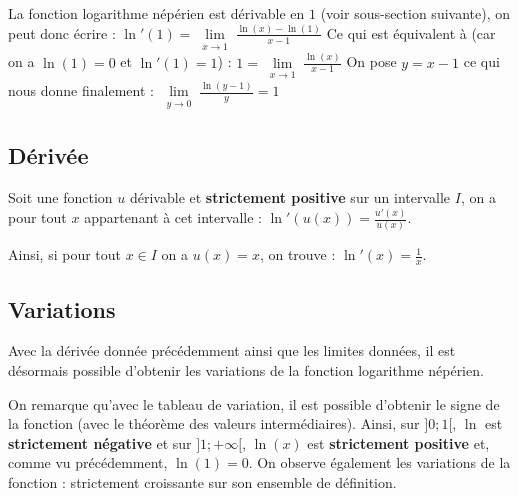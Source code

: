 	\begin{demonstration}
		La fonction logarithme népérien est dérivable en $1$ (voir sous-section suivante), on peut donc écrire :
		\newpar
		$\displaystyle{\ln'(1) = \lim\limits_{\substack{x \rightarrow 1}} \frac{\ln(x) - \ln(1)}{x - 1}}$
		\newpar
		Ce qui est équivalent à (car on a $\ln(1) = 0$ et $\ln'(1) = 1$) :
		\newpar
		$\displaystyle{1 = \lim\limits_{\substack{x \rightarrow 1}} \frac{\ln(x)}{x - 1}}$
		\newpar
		On pose $y = x-1$ ce qui nous donne finalement :
		\newpar
		$\displaystyle{\lim\limits_{\substack{y \rightarrow 0}} \frac{\ln(y - 1)}{y} = 1}$
	\end{demonstration}
	
	\subsection{Dérivée}
	
	\begin{formula}
		Soit une fonction $u$ dérivable et \textbf{strictement positive} sur un intervalle $I$, on a pour tout $x$ appartenant à cet intervalle :
		\newpar
		$\displaystyle{\ln'(u(x)) = \frac{u'(x)}{u(x)}}$.
	\end{formula}
	
	\begin{formula}[Dérivée]
		Ainsi, si pour tout $x \in I$ on a $u(x) = x$, on trouve :
		\newpar
		$\displaystyle{\ln'(x) = \frac{1}{x}}$.
	\end{formula}
	
	\subsection{Variations}
	
	Avec la dérivée donnée précédemment ainsi que les limites données, il est désormais possible d'obtenir les variations de la fonction logarithme népérien.
	
	\begin{formula}
		\contentwidth[big]
		
		On remarque qu'avec le tableau de variation, il est possible d'obtenir le signe de la fonction (avec le théorème des valeurs
		intermédiaires).
		\newpar
		Ainsi, sur $]0;1[$, $\ln$ est \textbf{strictement négative} et sur $]1;+\infty[$,
		$\ln(x)$ est \textbf{strictement positive} et, comme vu précédemment, $\ln(1) = 0$.
		\newpar
		On observe également les variations de la fonction : strictement croissante sur son ensemble de définition.
	\end{formula}

